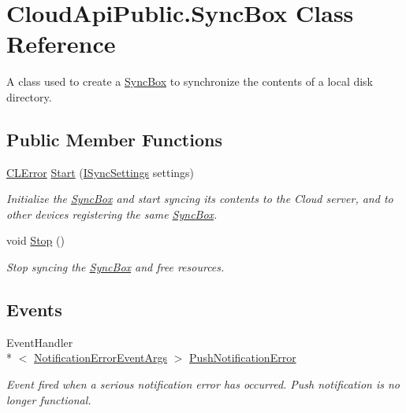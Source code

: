 \hypertarget{class_cloud_api_public_1_1_sync_box}{\section{Cloud\-Api\-Public.\-Sync\-Box Class Reference}
\label{class_cloud_api_public_1_1_sync_box}
}


A class used to create a \hyperlink{class_cloud_api_public_1_1_sync_box}{Sync\-Box} to synchronize the contents of a local disk directory.  


\subsection*{Public Member Functions}
\begin{DoxyCompactItemize}
\item 
\hyperlink{class_cloud_api_public_1_1_model_1_1_c_l_error}{C\-L\-Error} \hyperlink{class_cloud_api_public_1_1_sync_box_ae0ad47eda9e97480349950618ec266fa}{Start} (\hyperlink{interface_cloud_api_public_1_1_interfaces_1_1_i_sync_settings}{I\-Sync\-Settings} settings)
\begin{DoxyCompactList}\small\item\em Initialize the \hyperlink{class_cloud_api_public_1_1_sync_box}{Sync\-Box} and start syncing its contents to the Cloud server, and to other devices registering the same \hyperlink{class_cloud_api_public_1_1_sync_box}{Sync\-Box}. \end{DoxyCompactList}\item 
void \hyperlink{class_cloud_api_public_1_1_sync_box_a109192793123771a82a8c8dbbe918bb8}{Stop} ()
\begin{DoxyCompactList}\small\item\em Stop syncing the \hyperlink{class_cloud_api_public_1_1_sync_box}{Sync\-Box} and free resources. \end{DoxyCompactList}\end{DoxyCompactItemize}
\subsection*{Events}
\begin{DoxyCompactItemize}
\item 
Event\-Handler\\*
$<$ \hyperlink{class_cloud_api_public_1_1_push_notification_1_1_notification_error_event_args}{Notification\-Error\-Event\-Args} $>$ \hyperlink{class_cloud_api_public_1_1_sync_box_a37dc0c1c783ead1a4404e90016d9df60}{Push\-Notification\-Error}
\begin{DoxyCompactList}\small\item\em Event fired when a serious notification error has occurred. Push notification is no longer functional. \end{DoxyCompactList}\end{DoxyCompactItemize}


